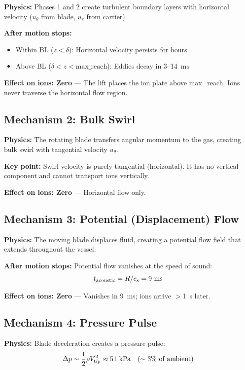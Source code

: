 \documentclass[11pt,a4paper]{article}
\begin{document}
\textbf{Physics:} Phases 1 and 2 create turbulent boundary layers with horizontal
velocity ($u_\theta$ from blade, $u_r$ from carrier).

\textbf{After motion stops:}
\begin{itemize}[nosep]
  \item Within BL ($z < \delta$): Horizontal velocity persists for hours
  \item Above BL ($\delta < z < \mathrm{max\_reach}$): Eddies decay in 3--14~ms
\end{itemize}

\textbf{Effect on ions: Zero} --- The lift places the ion plate above max\_reach.
Ions never traverse the horizontal flow region.

\subsection{Mechanism 2: Bulk Swirl}

\textbf{Physics:} The rotating blade transfers angular momentum to the gas,
creating bulk swirl with tangential velocity $u_\theta$.

\textbf{Key point:} Swirl velocity is purely tangential (horizontal). It has
no vertical component and cannot transport ions vertically.

\textbf{Effect on ions: Zero} --- Horizontal flow only.

\subsection{Mechanism 3: Potential (Displacement) Flow}

\textbf{Physics:} The moving blade displaces fluid, creating a potential flow
field that extends throughout the vessel.

\textbf{After motion stops:} Potential flow vanishes at the speed of sound:
\begin{equation}
  t_\mathrm{acoustic} = R/c_s = 9~\text{ms}
\end{equation}

\textbf{Effect on ions: Zero} --- Vanishes in 9~ms; ions arrive $>$1~s later.

\subsection{Mechanism 4: Pressure Pulse}

\textbf{Physics:} Blade deceleration creates a pressure pulse:
\begin{equation}
  \Delta p \sim \frac{1}{2}\rho V_\mathrm{tip}^2 \approx 51~\text{kPa}
    \quad (\sim 3\%~\text{of ambient})
\end{equation}
\end{document}
